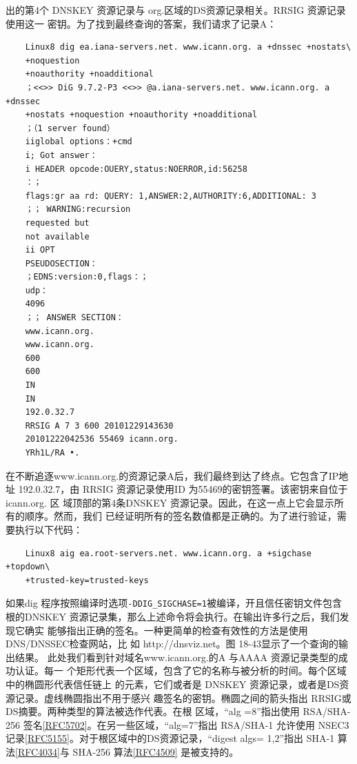 出的第4个 DNSKEY 资源记录与 org.区域的DS资源记录相关。RRSIG 资源记录使用这一
密钥。为了找到最终查询的答案，我们请求了记录A：
\begin{verbatim}
    Linux8 dig ea.iana-servers.net. www.icann.org. a +dnssec +nostats\
    +noquestion
    +noauthority +noadditional
    ；<<>> DiG 9.7.2-P3 <<>> @a.iana-servers.net. www.icann.org. a +dnssec
    +nostats +noquestion +noauthority +noadditional
    ；（1 server found）
    iiglobal options：+cmd
    i; Got answer：
    i HEADER opcode:OUERY,status:NOERROR,id:56258
    ：；
    flags:gr aa rd: QUERY: 1,ANSWER:2,AUTHORITY:6,ADDITIONAL: 3
    ；； WARNING:recursion
    requested but
    not available
    ii OPT
    PSEUDOSECTION：
    ；EDNS:version:0,flags：；
    udp：
    4096
    ；； ANSWER SECTION：
    www.icann.org.
    www.icann.org.
    600
    600
    IN
    IN
    192.0.32.7
    RRSIG A 7 3 600 20101229143630
    20101222042536 55469 icann.org.
    YRh1L/RA •.
\end{verbatim}
在不断追逐www.icann.org.的资源记录A后，我们最终到达了终点。它包含了IP地址
192.0.32.7，由 RRSIG 资源记录使用ID 为55469的密钥签署。该密钥来自位于 icann.org. 区
域顶部的第4条DNSKEY 资源记录。因此，在这一点上它会显示所有的顺序。然而，我们
已经证明所有的签名数值都是正确的。为了进行验证，需要执行以下代码：
\begin{verbatim}
    Linux8 aig ea.root-servers.net. www.icann.org. a +sigchase +topdown\
    +trusted-key=trusted-keys
\end{verbatim}
如果dig 程序按照编译时选项\verb|-DDIG_SIGCHASE=1|被编译，开且信任密钥文件包含
根的DNSKEY 资源记录集，那么上述命令将会执行。在输出许多行之后，我们发现它确实
能够指出正确的签名。一种更简单的检查有效性的方法是使用 DNS/DNSSEC检查网站，比
如 http://dnsviz.net。图 18-43显示了一个查询的输出结果。
此处我们看到针对域名www.icann.org.的A 与AAAA 资源记录类型的成功认证。每一
个矩形代表一个区域，包含了它的名称与被分析的时间。每个区域中的椭圆形代表信任链上
的元素，它们或者是 DNSKEY 资源记录，或者是DS资源记录。虚线椭圆指出不用于感兴
趣签名的密钥。椭圆之间的箭头指出 RRSIG或DS摘要。两种类型的算法被选作代表。在根
区域，“alg =8”指出使用 RSA/SHA-256 签名\href{https://www.rfc-editor.org/rfc/rfc5702}{[RFC5702]}。在另一些区域，“alg=7”指出
RSA/SHA-1 允许使用 NSEC3记录\href{https://www.rfc-editor.org/rfc/rfc5155}{[RFC5155]}。对于根区域中的DS资源记录，“digest algs=
1,2”指出 SHA-1 算法\href{https://www.rfc-editor.org/rfc/rfc4034}{[RFC4034]}与 SHA-256 算法\href{https://www.rfc-editor.org/rfc/rfc4509}{[RFC4509]} 是被支持的。

